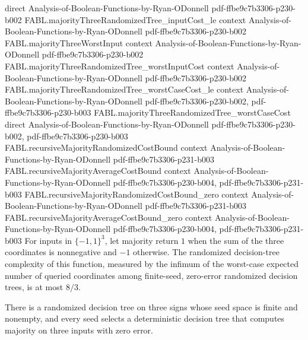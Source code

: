 \begin{theorem}
  {direct}
  {Analysis-of-Boolean-Functions-by-Ryan-ODonnell}
  {pdf-ffbe9c7b3306-p230-b002}
\proofstep
  {FABL.majorityThreeRandomizedTree_inputCost_le}
  {context}
  {Analysis-of-Boolean-Functions-by-Ryan-ODonnell}
  {pdf-ffbe9c7b3306-p230-b002}
\proofstep
  {FABL.majorityThreeWorstInput}
  {context}
  {Analysis-of-Boolean-Functions-by-Ryan-ODonnell}
  {pdf-ffbe9c7b3306-p230-b002}
\proofstep
  {FABL.majorityThreeRandomizedTree_worstInputCost}
  {context}
  {Analysis-of-Boolean-Functions-by-Ryan-ODonnell}
  {pdf-ffbe9c7b3306-p230-b002}
\proofstep
  {FABL.majorityThreeRandomizedTree_worstCaseCost_le}
  {context}
  {Analysis-of-Boolean-Functions-by-Ryan-ODonnell}
  {pdf-ffbe9c7b3306-p230-b002,
    pdf-ffbe9c7b3306-p230-b003}
\proofstep
  {FABL.majorityThreeRandomizedTree_worstCaseCost}
  {direct}
  {Analysis-of-Boolean-Functions-by-Ryan-ODonnell}
  {pdf-ffbe9c7b3306-p230-b002,
    pdf-ffbe9c7b3306-p230-b003}
\proofstep
  {FABL.recursiveMajorityRandomizedCostBound}
  {context}
  {Analysis-of-Boolean-Functions-by-Ryan-ODonnell}
  {pdf-ffbe9c7b3306-p231-b003}
\proofstep
  {FABL.recursiveMajorityAverageCostBound}
  {context}
  {Analysis-of-Boolean-Functions-by-Ryan-ODonnell}
  {pdf-ffbe9c7b3306-p230-b004,
    pdf-ffbe9c7b3306-p231-b003}
\proofstep
  {FABL.recursiveMajorityRandomizedCostBound_zero}
  {context}
  {Analysis-of-Boolean-Functions-by-Ryan-ODonnell}
  {pdf-ffbe9c7b3306-p231-b003}
\proofstep
  {FABL.recursiveMajorityAverageCostBound_zero}
  {context}
  {Analysis-of-Boolean-Functions-by-Ryan-ODonnell}
  {pdf-ffbe9c7b3306-p230-b004,
    pdf-ffbe9c7b3306-p231-b003}
For inputs in $\{-1,1\}^3$, let majority return $1$ when the sum of the three
coordinates is nonnegative and $-1$ otherwise. The randomized decision-tree complexity
of this function, measured by the infimum of the worst-case expected number of queried
coordinates among finite-seed, zero-error randomized decision trees, is at most $8/3$.
\end{theorem}

\begin{definition}
\label{FABL.majorityThreeDeterministicRandomizedTree}
\leanok
{}
There is a randomized decision tree on three signs whose seed space is finite and
nonempty, and every seed selects a deterministic decision tree that computes majority on
three inputs with zero error.
\end{definition}

